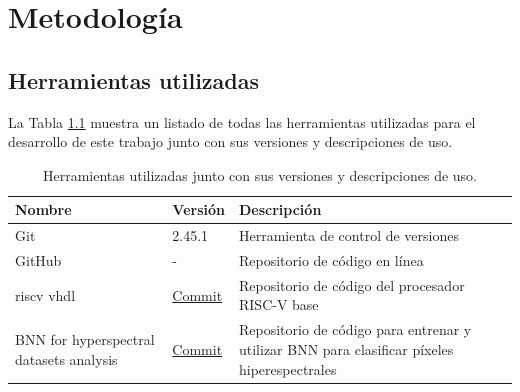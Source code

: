 \chapter{Metodología} \label{ch:metodologia}

\section{Herramientas utilizadas}

La Tabla \ref{tab:herramientas} muestra un listado de todas las herramientas utilizadas para el desarrollo de este trabajo junto con sus versiones y descripciones de uso.

\begin{center}
\begin{longtable}{|p{}|p{}|p{}|}
\caption{Herramientas utilizadas junto con sus versiones y descripciones de uso.} \label{tab:herramientas} \\\hline
\textbf{Nombre}                         & \textbf{Versión}                                                                                                                             & \textbf{Descripción}                                                                                                                             \\\hline
Git \cite{git}& 2.45.1                                                                                                                                       & Herramienta de control de versiones                                                                                                              \\\hline
GitHub \cite{github}& -                                                                                                                                            & Repositorio de código en línea                                                                                                                   \\\hline
riscv vhdl \cite{base_riscv_cpu_git}                             & \href{https://github.com/Samulix20/riscv-vhdl/tree/8c2e89691ab1f7f0a55ca16d24f282f337c6c5aa}{Commit}                                         & Repositorio de código del procesador RISC-V base                                                                                                 \\\hline
BNN for hyperspectral datasets analysis \cite{bnn_hyper_git}& \href{https://github.com/universidad-zaragoza/BNN_for_hyperspectral_datasets_analysis/tree/be44f2b7f82efa1772938e87819a7f861ca3e449}{Commit} & Repositorio de código para entrenar y utilizar BNN para clasificar píxeles hiperespectrales                                                      \\\hline

\end{longtable}
\end{center}
